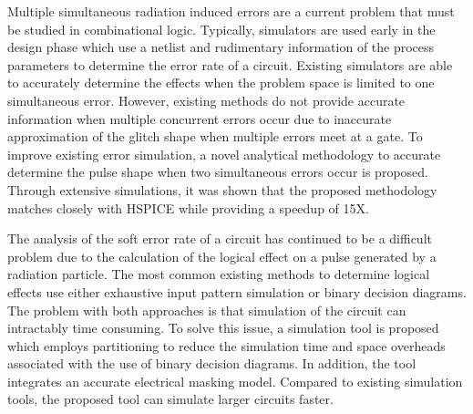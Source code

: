 Multiple simultaneous radiation induced errors are a current problem that must be studied in combinational logic. Typically, simulators are used early in the design phase which use a netlist and rudimentary information of the process parameters to determine the error rate of a circuit. Existing simulators are able to accurately determine the effects when the problem space is limited to one simultaneous error. However, existing methods do not provide accurate information when multiple concurrent errors occur due to inaccurate approximation of the glitch shape when multiple errors meet at a gate. To improve existing error simulation, a novel analytical methodology to accurate determine the pulse shape when two simultaneous errors occur is proposed. Through extensive simulations, it was shown that the proposed methodology matches closely with HSPICE while providing a speedup of 15X.

The analysis of the soft error rate of a circuit has continued to be a difficult problem due to the calculation of the logical effect on a pulse generated by a radiation particle. The most common existing methods to determine logical effects use either exhaustive input pattern simulation or binary decision diagrams. The problem with both approaches is that simulation of the circuit can intractably time consuming. To solve this issue, a simulation tool is proposed which employs partitioning to reduce the simulation time and space overheads associated with the use of binary decision diagrams. In addition, the tool integrates an accurate electrical masking model. Compared to existing simulation tools, the proposed tool can simulate larger circuits faster.
\newpage

